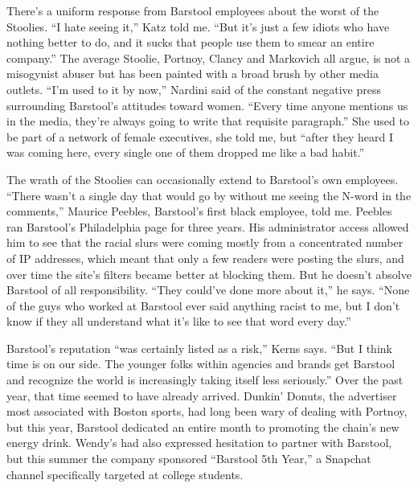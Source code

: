 There's a uniform response from Barstool employees about the worst of
the Stoolies. ``I hate seeing it,'' Katz told me. ``But it's just a few
idiots who have nothing better to do, and it sucks that people use them
to smear an entire company.'' The average Stoolie, Portnoy, Clancy and
Markovich all argue, is not a misogynist abuser but has been painted
with a broad brush by other media outlets. ``I'm used to it by now,''
Nardini said of the constant negative press surrounding Barstool's
attitudes toward women. ``Every time anyone mentions us in the media,
they're always going to write that requisite paragraph.'' She used to be
part of a network of female executives, she told me, but ``after they
heard I was coming here, every single one of them dropped me like a bad
habit.''

The wrath of the Stoolies can occasionally extend to Barstool's own
employees. ``There wasn't a single day that would go by without me
seeing the N-word in the comments,'' Maurice Peebles, Barstool's first
black employee, told me. Peebles ran Barstool's Philadelphia page for
three years. His administrator access allowed him to see that the racial
slurs were coming mostly from a concentrated number of IP addresses,
which meant that only a few readers were posting the slurs, and over
time the site's filters became better at blocking them. But he doesn't
absolve Barstool of all responsibility. ``They could've done more about
it,'' he says. ``None of the guys who worked at Barstool ever said
anything racist to me, but I don't know if they all understand what it's
like to see that word every day.''

Barstool's reputation ``was certainly listed as a risk,'' Kerns says.
``But I think time is on our side. The younger folks within agencies and
brands get Barstool and recognize the world is increasingly taking
itself less seriously.'' Over the past year, that time seemed to have
already arrived. Dunkin' Donuts, the advertiser most associated with
Boston sports, had long been wary of dealing with Portnoy, but this
year, Barstool dedicated an entire month to promoting the chain's new
energy drink. Wendy's had also expressed hesitation to partner with
Barstool, but this summer the company sponsored ``Barstool 5th Year,'' a
Snapchat channel specifically targeted at college students.

